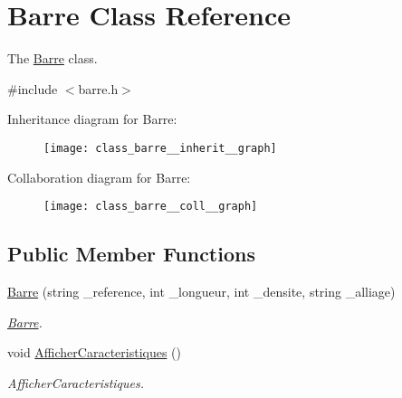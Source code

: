 \hypertarget{class_barre}{}\section{Barre Class Reference}
\label{class_barre}


The \hyperlink{class_barre}{Barre} class.  




{\ttfamily \#include $<$barre.\+h$>$}



Inheritance diagram for Barre\+:
\nopagebreak
\begin{figure}[H]
\begin{center}
\leavevmode
\texttt{[image: class\_barre\_\_inherit\_\_graph]}
\end{center}
\end{figure}


Collaboration diagram for Barre\+:
\nopagebreak
\begin{figure}[H]
\begin{center}
\leavevmode
\texttt{[image: class\_barre\_\_coll\_\_graph]}
\end{center}
\end{figure}
\subsection*{Public Member Functions}
\begin{DoxyCompactItemize}
\item 
\hyperlink{class_barre_a9de18a6ba5cbea5bb3cd95b52450eea0}{Barre} (string \+\_\+reference, int \+\_\+longueur, int \+\_\+densite, string \+\_\+alliage)
\begin{DoxyCompactList}\small\item\em \hyperlink{class_barre}{Barre}. \end{DoxyCompactList}\item 
void \hyperlink{class_barre_a2e844be9d7c76a74d61cb14243a1bade}{Afficher\+Caracteristiques} ()
\begin{DoxyCompactList}\small\item\em Afficher\+Caracteristiques. \end{DoxyCompactList}\end{DoxyCompactItemize}
